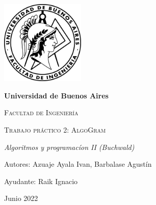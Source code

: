\documentclass{report}
\begin{document}
  \begin{titlepage}
  \centering
    {\includegraphics[width=0.3\textwidth]{logo-fiuba.png}\par}
    \vspace{1cm}
    {\bfseries\LARGE Universidad de Buenos Aires \par}
    \vspace{1cm}
    {\scshape\Large Facultad de Ingeniería \par}
    \vspace{3cm}
    {\scshape\Huge Trabajo pr\'actico 2: AlgoGram \par}
    \vspace{3cm}
    {\itshape\Large Algoritmos y programacíon II (Buchwald) \par}
    \vfill
    {\Large Autores: Azuaje Ayala Ivan, Barbalase Agust\'in \par}
    \vfill
    {\Large Ayudante: Raik Ignacio \par}
    \vfill
    {\Large Junio 2022 \par}
  \end{titlepage}
\end{document}
